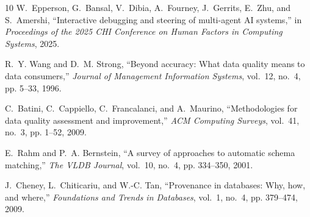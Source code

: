 \documentclass[conference]{IEEEtran}
\begin{document}
\begin{thebibliography}{10}
W.~Epperson, G.~Bansal, V.~Dibia, A.~Fourney, J.~Gerrits, E.~Zhu, and
  S.~Amershi, ``Interactive debugging and steering of multi-agent {AI}
  systems,'' in \emph{Proceedings of the 2025 CHI Conference on Human Factors
  in Computing Systems}, 2025.

R.~Y. Wang and D.~M. Strong, ``Beyond accuracy: What data quality means to data
  consumers,'' \emph{Journal of Management Information Systems}, vol.~12,
  no.~4, pp. 5--33, 1996.

C.~Batini, C.~Cappiello, C.~Francalanci, and A.~Maurino, ``Methodologies for
  data quality assessment and improvement,'' \emph{ACM Computing Surveys},
  vol.~41, no.~3, pp. 1--52, 2009.

E.~Rahm and P.~A. Bernstein, ``A survey of approaches to automatic schema
  matching,'' \emph{The VLDB Journal}, vol.~10, no.~4, pp. 334--350, 2001.

J.~Cheney, L.~Chiticariu, and W.-C. Tan, ``Provenance in databases: Why, how,
  and where,'' \emph{Foundations and Trends in Databases}, vol.~1, no.~4, pp.
  379--474, 2009.

\end{thebibliography}
\end{document}
